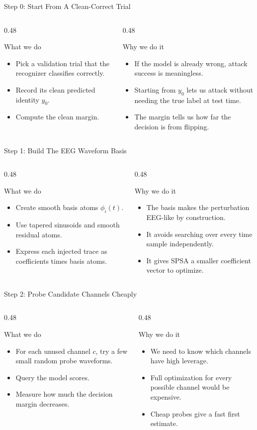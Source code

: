\documentclass[aspectratio=169,11pt]{beamer}
\newcommand{\whatwhy}[2]{%
\begin{columns}[T,onlytextwidth]
  \begin{column}{0.48\textwidth}
    \begin{block}{What we do}
      #1
    \end{block}
  \end{column}
  \begin{column}{0.48\textwidth}
    \begin{block}{Why we do it}
      #2
    \end{block}
  \end{column}
\end{columns}
}
\begin{document}
\begin{frame}{Step 0: Start From A Clean-Correct Trial}
\whatwhy{
\begin{itemize}
  \item Pick a validation trial that the recognizer classifies correctly.
  \item Record its clean predicted identity \(y_0\).
  \item Compute the clean margin.
\end{itemize}
}{
\begin{itemize}
  \item If the model is already wrong, attack success is meaningless.
  \item Starting from \(y_0\) lets us attack without needing the true label at test time.
  \item The margin tells us how far the decision is from flipping.
\end{itemize}
}
\end{frame}

\begin{frame}{Step 1: Build The EEG Waveform Basis}
\whatwhy{
\begin{itemize}
  \item Create smooth basis atoms \(\phi_i(t)\).
  \item Use tapered sinusoids and smooth residual atoms.
  \item Express each injected trace as coefficients times basis atoms.
\end{itemize}
}{
\begin{itemize}
  \item The basis makes the perturbation EEG-like by construction.
  \item It avoids searching over every time sample independently.
  \item It gives SPSA a smaller coefficient vector to optimize.
\end{itemize}
}
\end{frame}

\begin{frame}{Step 2: Probe Candidate Channels Cheaply}
\whatwhy{
\begin{itemize}
  \item For each unused channel \(c\), try a few small random probe waveforms.
  \item Query the model scores.
  \item Measure how much the decision margin decreases.
\end{itemize}
}{
\begin{itemize}
  \item We need to know which channels have high leverage.
  \item Full optimization for every possible channel would be expensive.
  \item Cheap probes give a fast first estimate.
\end{itemize}
}
\end{frame}
\end{document}
